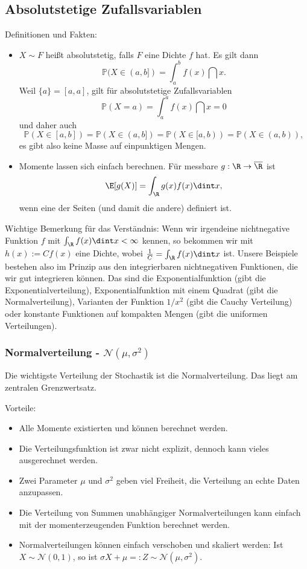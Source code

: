 \subsection{Absolutstetige Zufallsvariablen}
Definitionen und Fakten:
\begin{itemize}
	\item $X\sim F$ hei\ss t absolutstetig, falls $F$ eine Dichte $f$ hat. Es gilt dann $$\mathbb P(X\in (a,b])=\int_a^b f(x)\dint x.$$
	Weil $\{a\}=[a,a]$, gilt  f\"ur absolutstetige Zufallsvariablen $$\mathbb P(X=a)=\int_a^a f(x)\dint x=0$$ und daher auch 
 	$$ \mathbb P(X\in [a,b])=\mathbb P(X\in (a,b])=\mathbb P(X\in [a,b))=\mathbb P(X\in (a,b)),$$
	es gibt also keine Masse auf einpunktigen Mengen.
	\item Momente lassen sich einfach berechnen. F\"ur messbare $g:\R\to \overline \R$ ist
	\begin{align*}
		\E[g(X)]=\int_\R g(x) f(x) \dint x,
	\end{align*}
	wenn eine der Seiten (und damit die andere) definiert ist.
\end{itemize}

Wichtige Bemerkung f\"ur das Verst\"andnis: Wenn wir irgendeine nichtnegative Funktion $f$ mit $\int_\R f(x)\dint x<\infty$ kennen, so bekommen wir mit $h(x):= C f(x)$ eine Dichte, wobei $\frac 1 C=\int_\R f(x)\dint x$ ist. Unsere Beispiele bestehen also im Prinzip aus den integrierbaren nichtnegativen Funktionen, die wir gut integrieren k\"onnen. Das sind die Exponentialfunktion (gibt die Exponentialverteilung), Exponentialfunktion mit einem Quadrat (gibt die Normalverteilung), Varianten der Funktion $1/x^2$ (gibt die Cauchy Verteilung) oder konstante Funktionen auf kompakten Mengen (gibt die uniformen Verteilungen).

\subsubsection*{Normalverteilung - $\mathcal N(\mu,\sigma^2)$}
Die wichtigste Verteilung der Stochastik ist die Normalverteilung. Das liegt am zentralen Grenzwertsatz. \smallskip

{Vorteile:} 
\begin{itemize}
\item Alle Momente existierten und k\"onnen berechnet werden.
\item Die Verteilungsfunktion ist zwar nicht explizit, dennoch kann vieles ausgerechnet werden.
\item	Zwei Parameter $\mu$ und $\sigma^2$ geben viel Freiheit, die Verteilung an echte Daten anzupassen.
\item Die Verteilung von Summen unabh\"angiger Normalverteilungen kann einfach mit der momenterzeugenden Funktion berechnet werden.
\item Normalverteilungen k\"onnen einfach verschoben und skaliert werden: Ist $X\sim \mathcal N(0,1)$, so ist $\sigma X+\mu =:Z\sim  \mathcal N(\mu,\sigma^2)$.
\end{itemize}

